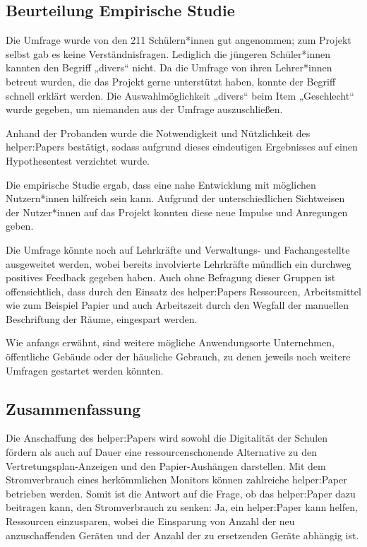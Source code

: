 \documentclass[10pt]{article}
\begin{document}
\subsection{Beurteilung Empirische Studie}
Die Umfrage wurde von den 211 Schülern*innen gut angenommen; zum Projekt selbst gab es keine Verständnisfragen. Lediglich die jüngeren Schüler*innen kannten den Begriff „divers“ nicht. Da die Umfrage von ihren Lehrer*innen betreut wurden, die das Projekt gerne unterstützt haben, konnte der Begriff schnell erklärt werden. Die Auswahlmöglichkeit „divers“ beim Item „Geschlecht“ wurde gegeben, um niemanden aus der Umfrage auszuschließen.

Anhand der Probanden wurde die Notwendigkeit und Nützlichkeit des helper:Papers bestätigt, sodass aufgrund dieses eindeutigen Ergebnisses auf einen Hypothesentest verzichtet wurde.

Die empirische Studie ergab, dass eine nahe Entwicklung mit möglichen Nutzern*innen hilfreich sein kann. Aufgrund der unterschiedlichen Sichtweisen der Nutzer*innen auf das Projekt konnten diese neue Impulse und Anregungen geben.

Die Umfrage könnte noch auf Lehrkräfte und Verwaltungs- und Fachangestellte ausgeweitet werden, wobei bereits involvierte Lehrkräfte mündlich ein durchweg positives Feedback gegeben haben. Auch ohne Befragung dieser Gruppen ist offensichtlich, dass durch den Einsatz des helper:Papers Ressourcen, Arbeitsmittel wie zum Beispiel Papier und auch Arbeitszeit durch den Wegfall der manuellen Beschriftung der Räume, eingespart werden.

Wie anfangs erwähnt, sind weitere mögliche Anwendungsorte Unternehmen, öffentliche Gebäude oder der häusliche Gebrauch, zu denen jeweils noch weitere Umfragen gestartet werden könnten.

\subsection{Zusammenfassung}
Die Anschaffung des helper:Papers wird sowohl die Digitalität der Schulen fördern als auch auf Dauer eine ressourcenschonende Alternative zu den Vertretungsplan-Anzeigen und den Papier-Aushängen darstellen. Mit dem Stromverbrauch eines herkömmlichen Monitors können zahlreiche helper:Paper betrieben werden. Somit ist die Antwort auf die Frage, ob das helper:Paper dazu beitragen kann, den Stromverbrauch zu senken: Ja, ein helper:Paper kann helfen, Ressourcen einzusparen, wobei die Einsparung von Anzahl der neu anzuschaffenden Geräten und der Anzahl der zu ersetzenden Geräte abhängig ist. 
\end{document}
